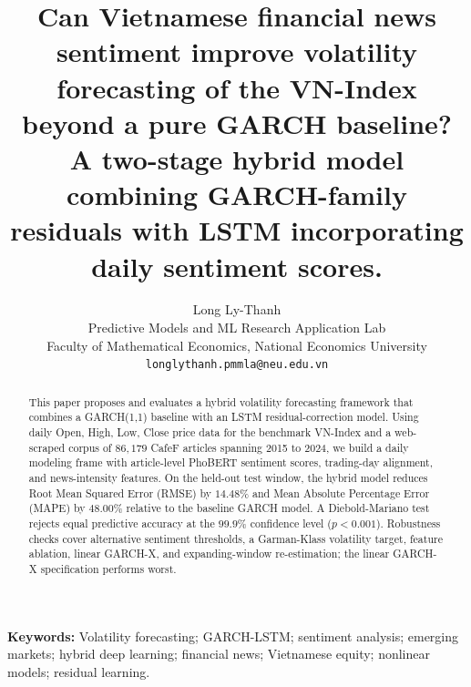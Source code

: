 \documentclass[12pt,a4paper]{article}
\title{\textbf{Can Vietnamese financial news sentiment improve volatility forecasting of the VN-Index beyond a pure GARCH baseline? A two-stage hybrid model combining GARCH-family residuals with LSTM incorporating daily sentiment scores.}}
\author{\normalsize Long Ly-Thanh\\
\normalsize Predictive Models and ML Research Application Lab\\
\normalsize Faculty of Mathematical Economics, National Economics University\\
\normalsize \texttt{longlythanh.pmmla@neu.edu.vn}}
\date{}
\begin{document}
\maketitle

\begin{abstract}
This paper proposes and evaluates a hybrid volatility forecasting framework that combines a GARCH(1,1) baseline with an LSTM residual-correction model. Using daily Open, High, Low, Close price data for the benchmark VN-Index and a web-scraped corpus of $86,179$ CafeF articles spanning 2015 to 2024, we build a daily modeling frame with article-level PhoBERT sentiment scores, trading-day alignment, and news-intensity features. On the held-out test window, the hybrid model reduces Root Mean Squared Error (RMSE) by $14.48\%$ and Mean Absolute Percentage Error (MAPE) by $48.00\%$ relative to the baseline GARCH model. A Diebold-Mariano test rejects equal predictive accuracy at the $99.9\%$ confidence level ($p < 0.001$). Robustness checks cover alternative sentiment thresholds, a Garman-Klass volatility target, feature ablation, linear GARCH-X, and expanding-window re-estimation; the linear GARCH-X specification performs worst.
\end{abstract}

\noindent\textbf{Keywords:} Volatility forecasting; GARCH-LSTM; sentiment analysis; emerging markets; hybrid deep learning; financial news; Vietnamese equity; nonlinear models; residual learning.

\newpage
\tableofcontents
\newpage







\newpage


\newpage
\appendix

\end{document}
